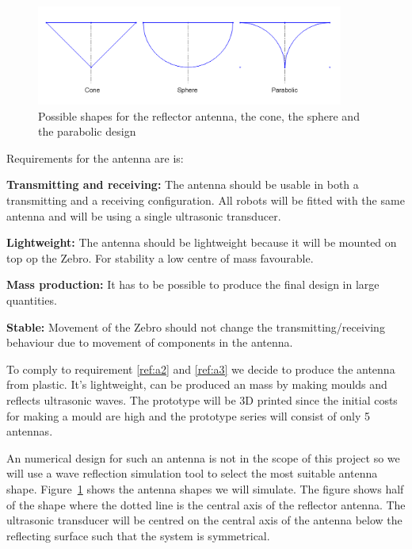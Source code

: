 \begin{figure}[H]
\centering
\includegraphics[width=0.9\textwidth]{Figures/ant_shapes.PNG}
\caption{Possible shapes for the reflector antenna, the cone, the sphere and the parabolic design}
\label{fig:shapes}
\end{figure}

Requirements for the antenna are is:

\begin{enumerate}[label={[A.\arabic*]}]
  \item
  \textbf{Transmitting and receiving:} The antenna should be usable in both a transmitting and a receiving configuration. All robots will be fitted with the same antenna and will be using a single ultrasonic transducer. \label{ref:T_R}
  \item\label{ref:a2}
  \textbf{Lightweight:} The antenna should be lightweight because it will be mounted on top op the Zebro. For stability a low centre of mass favourable.
  \item\label{ref:a3}
  \textbf{Mass production:} It has to be possible to produce the final design in large quantities.
  \item
  \textbf{Stable:} Movement of the Zebro should not change the transmitting/receiving behaviour due to movement of components in the antenna.
\end{enumerate}

To comply to requirement \ref{ref:a2} and \ref{ref:a3} we decide to produce the antenna from plastic. It's lightweight, can be produced an mass by making moulds and reflects ultrasonic waves.
The prototype will be 3D printed since the initial costs for making a mould are high and the prototype series will consist of only 5 antennas.

An numerical design for such an antenna is not in the scope of this project so we will use a wave reflection simulation tool to select the most suitable antenna shape.
Figure~\ref{fig:shapes} shows the antenna shapes we will simulate.
The figure shows half of the shape where the dotted line is the central axis of the reflector antenna.
The ultrasonic transducer will be centred on the central axis of the antenna below the reflecting surface such that the system is symmetrical.

